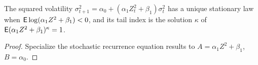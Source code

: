 \begin{theorem}
  \label{thm:garch}
  \leanok
  The squared volatility $\sigma^2_{t+1} = \alpha_0 + (\alpha_1 Z_t^2 + \beta_1)\sigma^2_t$ has a unique stationary law when
  $\mathsf{E}\log(\alpha_1 Z^2 + \beta_1) < 0$, and its tail index is the solution $\kappa$ of $\mathsf{E}(\alpha_1 Z^2 + \beta_1)^\kappa = 1$.
\end{theorem}
\begin{proof}
  \leanok
  Specialize the stochastic recurrence equation results to $A = \alpha_1 Z^2 + \beta_1$, $B = \alpha_0$.
\end{proof}
